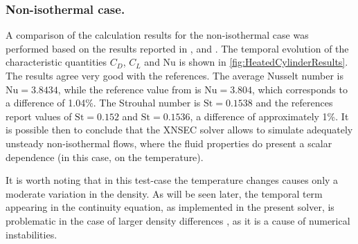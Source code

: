 \subsubsection{Non-isothermal case.}
A comparison of the calculation results for the non-isothermal case was performed based on the results reported in \textcite{shiHeatingEffectSteady2004}, \textcite{wangRelationshipEffectiveReynolds2000} and \textcite{henninkLowMachNumberFlow2022}.
The temporal evolution of the characteristic quantities $C_D$, $C_L$ and Nu is shown in \cref{fig:HeatedCylinderResults}. The results agree very good with the references. The average Nusselt number is  $\text{Nu} = 3.8434$, while the reference value from \textcite{henninkLowMachNumberFlow2022} is $\text{Nu} = 3.804$, which corresponds to a difference of 1.04\%. The Strouhal number is $\text{St} = 0.1538$ and the references report values of $\text{St} = 0.152$ and $\text{St} = 0.1536$, a difference of approximately 1\%. It is possible then to conclude that the XNSEC solver allows to simulate adequately unsteady non-isothermal flows, where the fluid properties do present a scalar dependence (in this case, on the temperature). 

It is worth noting that in this test-case the temperature changes causes only a moderate variation in the density. As will be seen later, the temporal term appearing in the continuity equation, as implemented in the present solver, is problematic in the case of larger density differences \parencite{knikkerComparativeStudyHighorder2011}, as it is a cause of numerical instabilities.
\FloatBarrier